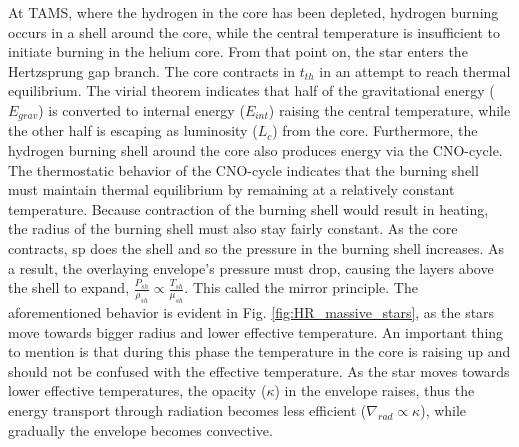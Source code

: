 At TAMS, where the hydrogen in the core has been depleted, hydrogen burning occurs in a shell around the core, while the central temperature is insufficient to initiate burning in the helium core. From that point on, the star enters the Hertzsprung gap branch. The core contracts in $t_{th}$ in an attempt to reach thermal equilibrium. The virial theorem indicates that half of the gravitational energy ($E_{grav}$) is converted to internal energy ($E_{int}$) raising the central temperature, while the other half is escaping as luminosity ($L_c$) from the core. Furthermore, the hydrogen burning shell around the core also produces energy via the CNO-cycle. The thermostatic behavior of the CNO-cycle indicates that the burning shell must maintain thermal equilibrium by remaining at a relatively constant temperature. Because contraction of the burning shell would result in heating, the radius of the burning shell must also stay fairly constant. As the core contracts, sp does the shell and so the pressure in the burning shell increases. As a result, the overlaying envelope's pressure must drop, causing the layers above the shell to expand, $\frac{P_{sh}}{\rho_{sh}} \propto \frac{T_{sh}}{\mu_{sh}}$. This called the mirror principle. The aforementioned behavior is evident in Fig. \ref{fig:HR_massive_stars}, as the stars move towards bigger radius and lower effective temperature. An important thing to mention is that during this phase the temperature in the core is raising up and should not be confused with the effective temperature. As the star moves towards lower effective temperatures, the opacity ($\kappa$) in the envelope raises, thus the energy transport through radiation becomes less efficient ($\nabla_{rad} \propto \kappa$), while gradually the envelope becomes convective.

